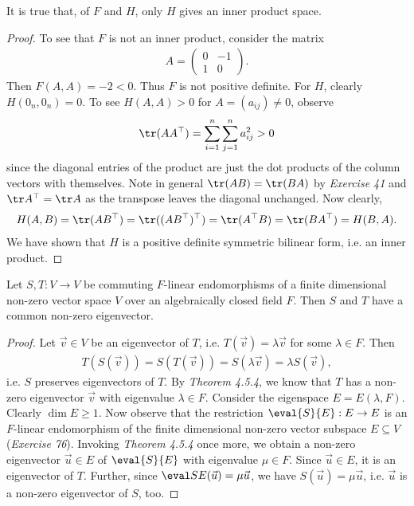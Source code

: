 \documentclass{article}
\begin{document}
\begin{claim*}[1c]
	It is true that, of $F$ and $H$, only $H$ gives an inner product space.
	\begin{proof}
		To see that $F$ is not an inner product, consider the matrix
		\begin{align*}
			A=\begin{pmatrix}
				  0 & -1 \\
				  1 & 0
			  \end{pmatrix}.
		\end{align*}
		Then $F(A,A)=-2<0$. Thus $F$ is not positive definite. For $H$, clearly
		$H(0_n,0_n)=0$. To see $H(A,A)>0$ for $A=(a_{ij})\not=0$, observe
		\begin{align*}
			\tr(AA^\top) = \sum_{i=1}^n \sum_{j=1}^n a_{ij}^2 > 0
		\end{align*}
		since the diagonal entries of the product are just the dot products of the column
		vectors with themselves. Note in general $\tr(AB)=\tr(BA)$ by \emph{Exercise 41}
		and $\tr A^\top=\tr A$ as the transpose leaves the diagonal unchanged. Now clearly,
		\begin{align*}
			H(A,B) = \tr(AB^\top) = \tr((AB^\top)^\top)  = \tr(A^\top B) = \tr(BA^\top) = H(B,A).
		\end{align*}
		We have shown that $H$ is a positive definite symmetric bilinear form, i.e. an inner
		product.
	\end{proof}
\end{claim*}

\begin{claim*}[2]
	Let $S,T:V\to V$ be commuting $F$-linear endomorphisms of a finite dimensional non-zero vector space $V$ over an
	algebraically closed field $F$. Then $S$ and $T$ have a common non-zero eigenvector.
	\begin{proof}
		Let $\vec v\in V$ be an eigenvector of $T$, i.e. $T(\vec v) = \lambda \vec v$ for some $\lambda\in F$.
		Then
		\begin{align*}
			T(S(\vec v)) = S(T(\vec v)) = S(\lambda\vec v) = \lambda S(\vec v),
		\end{align*}
		i.e. $S$ preserves eigenvectors of $T$. By \emph{Theorem 4.5.4}, we know that $T$ has
		a non-zero eigenvector $\vec v$ with eigenvalue $\lambda\in F$. Consider the eigenspace
		$E=E(\lambda, F)$. Clearly $\dim E \geq 1$. Now observe that the restriction
		$\eval{S}{E}:E\to E$ is an $F$-linear endomorphism of the finite dimensional non-zero vector
		subspace $E\subseteq V$ (\emph{Exercise 76}).
		Invoking \emph{Theorem 4.5.4} once more, we obtain a non-zero eigenvector $\vec u\in E$ of $\eval{S}{E}$
		with eigenvalue $\mu\in F$.
		Since $\vec u\in E$, it is an eigenvector of $T$. Further, since $\eval SE(\vec u) = \mu\vec u$,
		we have $S(\vec u)=\mu \vec u$, i.e. $\vec u$ is a non-zero eigenvector of $S$, too.
	\end{proof}
\end{claim*}
\end{document}
